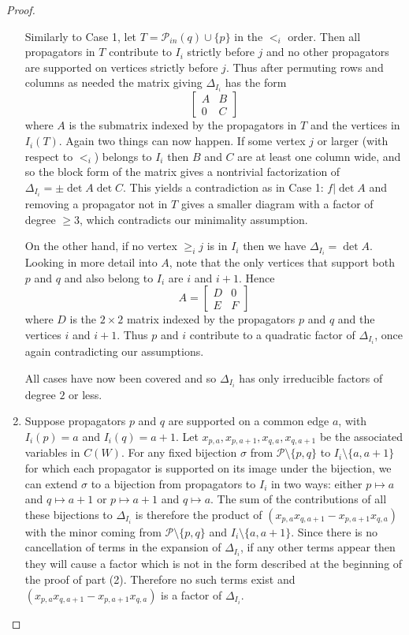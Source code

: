 \documentclass[11pt]{article}
\newcommand{\cP}{\mathcal{P}}
\theoremstyle{remark}
\theoremstyle{definition}
\begin{document}
\begin{proof}
\begin{enumerate}
Similarly to Case 1, let $T = \cP_{in}(q) \cup \{p\}$ in the $<_i$ order. Then all propagators in $T$ contribute to $I_i$ strictly before $j$ and no other propagators are supported on vertices strictly before $j$.  Thus after permuting rows and columns as needed the matrix giving $\Delta_{I_i}$ has the form 
\[
\begin{bmatrix} A & B \\ 0 & C\end{bmatrix}
\]
where $A$ is the submatrix indexed by the propagators in $T$ and the vertices in $I_i(T)$. Again two things can now happen.  If some vertex $j$ or larger (with respect to $<_i$) belongs to $I_i$ then $B$ and $C$ are at least one column wide, and so the block form of the matrix gives a nontrivial factorization of $\Delta_{I_i}=\pm\det A\det C$.  This yields a contradiction as in Case 1: $f|\det A$ and removing a propagator not in $T$ gives a smaller diagram with a factor of degree $\geq 3$, which contradicts our minimality assumption.

On the other hand, if no vertex $\geq_i j$ is in $I_i$ then we have $\Delta_{I_i} = \det A$.  Looking in more detail into $A$, note that the only vertices that support both $p$ and $q$ and also belong to $I_i$ are $i$ and $i+1$. Hence
\[
A = \begin{bmatrix} D & 0 \\ E & F\end{bmatrix}
\]
where $D$ is the $2\times 2$ matrix indexed by the propagators $p$ and $q$ and the vertices $i$ and $i+1$.  Thus $p$ and $i$ contribute to a quadratic factor of $\Delta_{I_i}$, once again contradicting our assumptions.

All cases have now been covered and so $\Delta_{I_i}$ has only irreducible factors of degree $2$ or less.

\item Suppose propagators $p$ and $q$ are supported on a common edge  $a$, with $I_i(p)=a$ and ${I_i(q)=a+1}$.  Let $x_{p,a},x_{p,a+1},x_{q,a},x_{q,a+1}$ be the associated variables in $C(W)$. For any fixed bijection $\sigma$ from $\cP\setminus\{p,q\}$ to $I_i \setminus\{a,a+1\}$ for which each propagator is supported on its image under the bijection, we can extend $\sigma$ to a bijection from propagators to $I_i$ in two ways: either $p\mapsto a$ and $q\mapsto a+1$ or $p\mapsto a+1$ and $q\mapsto a$.  The sum of the contributions of all these bijections to $\Delta_{I_i}$ is therefore the product of $(x_{p,a}x_{q,a+1}-x_{p,a+1}x_{q,a})$  with the minor coming from $\cP\setminus\{p, q\}$ and $I_i \setminus \{a,a+1\}$.  Since there is no cancellation of terms in the expansion of $\Delta_{I_i}$, if any other terms appear then they will cause a factor which is not in the form described at the beginning of the proof of part (2).  Therefore no such terms exist and $(x_{p,a}x_{q,a+1}-x_{p,a+1}x_{q,a})$ is a factor of $\Delta_{I_i}$. 


\end{enumerate}
\end{proof}
\end{document}
